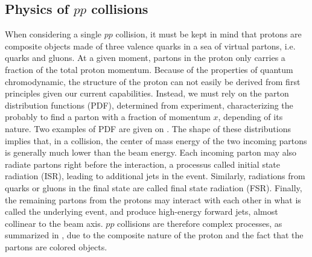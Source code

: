         \subsection{Physics of $pp$ collisions \label{sec:physicsFromCollisionsAtTheLHC}}

    When considering a single $pp$ collision, it must be kept in mind that protons are
    composite objects made of three valence quarks in a sea of virtual partons, i.e.
    quarks and gluons. At a given moment, partons in the proton only carries a fraction
    of the total proton momentum. Because of the properties of quantum chromodynamic, the
    structure of the proton can not easily be derived from first principles given our current
    capabilities. Instead, we must rely on the parton distribution functions (PDF), determined
    from experiment, characterizing the probably to find a parton with a fraction of
    momentum $x$, depending of its nature. Two examples of PDF are given on
    . The shape of these
    distributions implies that, in a collision, the center of mass energy of the two incoming
    partons is generally much lower than the beam energy.  Each incoming parton may also
    radiate partons right before the interaction, a processus called initial state radiation
    (ISR), leading to additional jets in the event. Similarly, radiations from quarks or
    gluons in the final state are called final state radiation (FSR). Finally, the remaining
    partons from the protons may interact with each other in what is called the underlying
    event, and produce high-energy forward jets, almost collinear to the beam axis. $pp$
    collisions are therefore complex processes, as summarized in ,
    due to the composite nature of the proton and the fact that the partons are colored
    objects.



